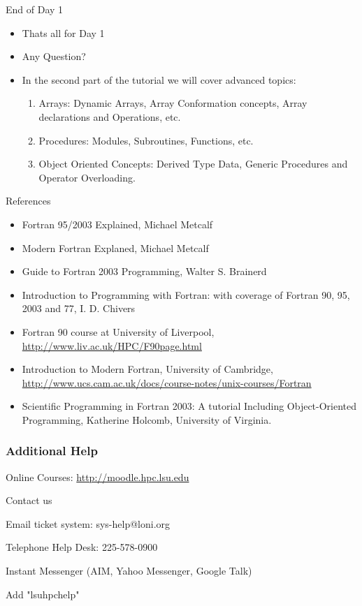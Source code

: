 \documentclass[c,mathserif,compress,xcolor=svgnames]{beamer}
\newcommand*\vardiamond{\textcolor{tigerspurple}{%
  \ensuremath{\blacklozenge}}}
\begin{document}
\begin{frame}{End of Day 1}
  \begin{itemize}
    \item Thats all for Day 1
    \item Any Question?
    \item In the second part of the tutorial we will cover advanced topics:
      \begin{enumerate}
        \item Arrays: Dynamic Arrays, Array Conformation concepts, Array declarations and Operations, etc.
        \item Procedures: Modules, Subroutines, Functions, etc.
        \item Object Oriented Concepts: Derived Type Data, Generic Procedures and Operator Overloading.
      \end{enumerate}
  \end{itemize}
\end{frame}
\begin{frame}{References}
  \begin{itemize}
    \item Fortran 95/2003 Explained, Michael Metcalf
    \item Modern Fortran Explaned, Michael Metcalf
    \item Guide to Fortran 2003 Programming, Walter S. Brainerd
    \item Introduction to Programming with Fortran: with coverage of Fortran 90, 95, 2003 and 77, I. D. Chivers
    \item Fortran 90 course at University of Liverpool, \url{http://www.liv.ac.uk/HPC/F90page.html}
    \item Introduction to Modern Fortran, University of Cambridge, \url{http://www.ucs.cam.ac.uk/docs/course-notes/unix-courses/Fortran}
    \item Scientific Programming in Fortran 2003: A tutorial Including Object-Oriented Programming, Katherine Holcomb, University of Virginia.
  \end{itemize}
\end{frame}

\begin{frame}
  \frametitle{Additional Help}
  \begin{itemize}
    \item Online Courses: \url{http://moodle.hpc.lsu.edu}
    \item Contact us
    \begin{enumerate}
      {\scriptsize
        \item[$\vardiamond$]Email ticket system: sys-help@loni.org
        \item[$\vardiamond$]Telephone Help Desk: 225-578-0900
        \item[$\vardiamond$]Instant Messenger (AIM, Yahoo Messenger, Google Talk)
        \begin{enumerate}
          {\scriptsize
            \item[$\bigstar$]Add "lsuhpchelp"
          }
        \end{enumerate}
      }
    \end{enumerate}
  \end{itemize}
\end{frame}
\end{document}
